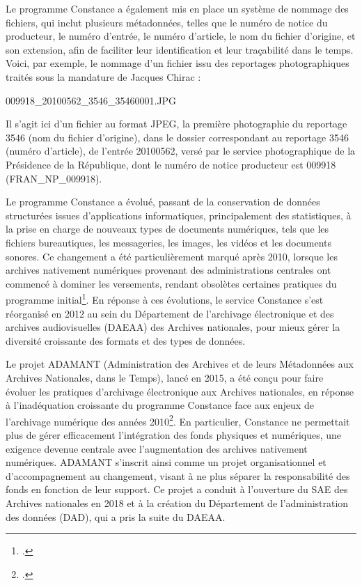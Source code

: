 Le programme Constance a également mis en place un système de nommage des fichiers, qui inclut plusieurs métadonnées, telles que le numéro de notice du producteur, le numéro d'entrée, le numéro d'article, le nom du fichier d'origine, et son extension, afin de faciliter leur identification et leur traçabilité dans le temps. Voici, par exemple, le nommage d'un fichier issu des reportages photographiques traités sous la mandature de Jacques Chirac : 

\begin{displayquote}
	\begin{center}
		009918\_20100562\_3546\_35460001.JPG
	\end{center}


Il s'agit ici d'un fichier au format JPEG, la première photographie du reportage 3546 (nom du fichier d'origine), dans le dossier correspondant au reportage 3546 (numéro d'article), de l'entrée 20100562, versé par le service photographique de la Présidence de la République, dont le numéro de notice producteur est 009918 (FRAN\_NP\_009918).
\end{displayquote}

Le programme Constance a évolué, passant de la conservation de données structurées issues d'applications informatiques, principalement des statistiques, à la prise en charge de nouveaux types de documents numériques, tels que les fichiers bureautiques, les messageries, les images, les vidéos et les documents sonores. Ce changement a été particulièrement marqué après 2010, lorsque les archives nativement numériques provenant des administrations centrales ont commencé à dominer les versements, rendant obsolètes certaines pratiques du programme initial\footcite{sinblimabarruArchivageNumeriqueAux2015}. En réponse à ces évolutions, le service Constance s'est réorganisé en 2012 au sein du Département de l'archivage électronique et des archives audiovisuelles (DAEAA) des Archives nationales, pour mieux gérer la diversité croissante des formats et des types de données.

Le projet ADAMANT (Administration des Archives et de leurs Métadonnées aux Archives Nationales, dans le Temps), lancé en 2015, a été conçu pour faire évoluer les pratiques d'archivage électronique aux Archives nationales, en réponse à l'inadéquation croissante du programme Constance face aux enjeux de l'archivage numérique des années 2010\footcite[p.220]{marcotteArchivesConduiteChangement2015}. En particulier, Constance ne permettait plus de gérer efficacement l'intégration des fonds physiques et numériques, une exigence devenue centrale avec l'augmentation des archives nativement numériques. ADAMANT s'inscrit ainsi comme un projet organisationnel et d'accompagnement au changement, visant à ne plus séparer la responsabilité des fonds en fonction de leur support. Ce projet a conduit à l'ouverture du SAE des Archives nationales en 2018 et à la création du Département de l'administration des données (DAD), qui a pris la suite du DAEAA.
\\

